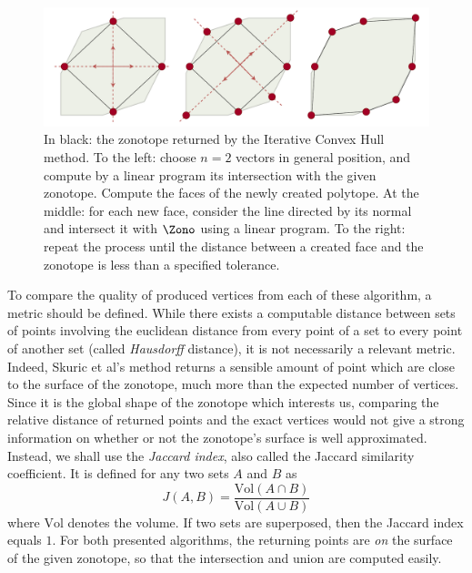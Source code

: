 \begin{figure}[!htb]
    \captionsetup{justification=centering}
    \centering
    \includegraphics[trim={0 0 0 0},clip, width=1\linewidth]{img/chapter_2/ich_method.pdf}
    
    \caption{In black: the zonotope returned by the Iterative Convex Hull method. To the left: choose $n=2$ vectors in general position, and compute by a linear program its intersection with the given zonotope. Compute the faces of the newly created polytope. At the middle: for each new face, consider the line directed by its normal and intersect it with $\Zono$ using a linear program. To the right: repeat the process until the distance between a created face and the zonotope is less than a specified tolerance.}
    \label{fig:ich_method}
\end{figure}


To compare the quality of produced vertices from each of these algorithm, a metric should be defined. While there exists a computable distance between sets of points involving the euclidean distance from every point of a set to every point of another set (called \emph{Hausdorff} distance), it is not necessarily a relevant metric. Indeed, Skuric et al's method returns a sensible amount of point which are close to the surface of the zonotope, much more than the expected number of vertices. Since it is the global shape of the zonotope which interests us, comparing the relative distance of returned points and the exact vertices would not give a strong information on whether or not the zonotope's surface is well approximated. Instead, we shall use the \emph{Jaccard index}, also called the Jaccard similarity coefficient. It is defined for any two sets $A$ and $B$ as
$$J(A, B) = \frac{\text{Vol}(A\cap B)}{\text{Vol}(A\cup B)}$$
where $\text{Vol}$ denotes the volume. 
If two sets are superposed, then the Jaccard index equals $1$.
For both presented algorithms, the returning points are \emph{on} the surface of the given zonotope, so that the intersection and union are computed easily.

